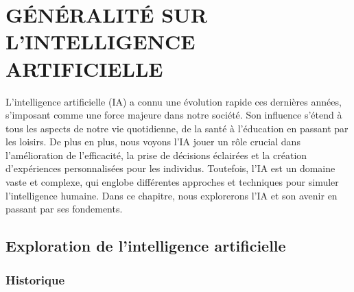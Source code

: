 \chapter{GÉNÉRALITÉ SUR L'INTELLIGENCE ARTIFICIELLE}
\begin{spacing}{1.2}
\minitoc
\thispagestyle{MyStyle}
\end{spacing}
\newpage

L'intelligence artificielle (IA) a connu une évolution rapide ces dernières années, s'imposant comme une force majeure dans notre société. Son influence s'étend à tous les aspects de notre vie quotidienne, de la santé à l'éducation en passant par les loisirs. De plus en plus, nous voyons l'IA jouer un rôle crucial dans l'amélioration de l'efficacité, la prise de décisions éclairées et la création d'expériences personnalisées pour les individus. Toutefois, l'IA est un domaine vaste et complexe, qui englobe différentes approches et techniques pour simuler l'intelligence humaine. Dans ce chapitre, nous explorerons l'IA et son avenir en passant par ses fondements.

\section{Exploration de l'intelligence artificielle}
\subsection{Historique}

